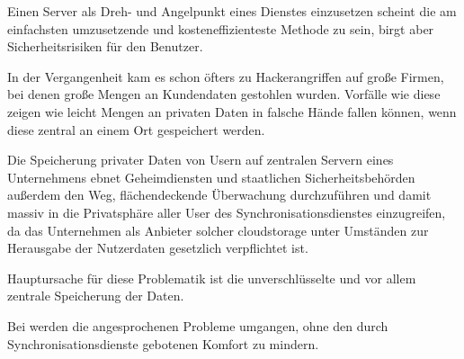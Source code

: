 Einen Server als Dreh- und Angelpunkt eines Dienstes einzusetzen scheint die am
einfachsten umzusetzende und kosteneffizienteste Methode zu sein, birgt aber Sicherheitsrisiken
für den Benutzer.

In der Vergangenheit kam es schon öfters zu Hackerangriffen auf große Firmen, bei
denen große Mengen an Kundendaten gestohlen wurden. Vorfälle wie diese zeigen wie leicht
Mengen an privaten Daten in falsche Hände fallen können, wenn diese zentral an einem Ort
gespeichert werden.

Die Speicherung privater Daten von Usern auf zentralen Servern eines Unternehmens ebnet
Geheimdiensten und staatlichen Sicherheitsbehörden außerdem den Weg, flächendeckende Überwachung
durchzuführen und damit massiv in die Privatsphäre aller User des Synchronisationsdienstes
einzugreifen, da das Unternehmen als Anbieter solcher \gls{cloudstorage} unter Umständen zur
Herausgabe der Nutzerdaten gesetzlich verpflichtet ist.

Hauptursache für diese Problematik ist die unverschlüsselte und vor allem zentrale
Speicherung der Daten.

Bei \sblit werden die angesprochenen Probleme umgangen, ohne den durch Synchronisationsdienste
gebotenen Komfort zu mindern.
